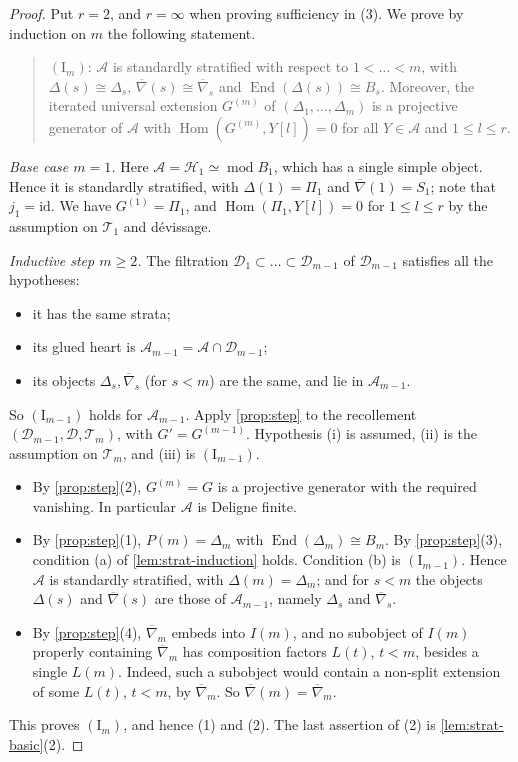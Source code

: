\documentclass[11pt,reqno]{amsart}
\theoremstyle{plain}
\theoremstyle{definition}
\theoremstyle{remark}
\DeclareMathOperator{\Hom}{Hom}
\DeclareMathOperator{\End}{End}
\newcommand{\modd}{\operatorname{mod}}
\newcommand{\nablabar}{\overline{\nabla}}
\newcommand{\cD}{\mathcal{D}}
\newcommand{\cA}{\mathcal{A}}
\newcommand{\cH}{\mathcal{H}}
\newcommand{\cT}{\mathcal{T}}
\begin{document}
\begin{proof}
Put $r=2$, and $r=\infty$ when proving sufficiency in (3). We prove by induction on $m$ the following statement.
\begin{quote}
$(\mathrm I_m)$: $\cA$ is standardly stratified with respect to $1<\dots<m$, with $\Delta(s)\cong\Delta_s$, $\nablabar(s)\cong\nablabar_s$ and $\End(\Delta(s))\cong B_s$. Moreover, the iterated universal extension $G^{(m)}$ of $(\Delta_1,\dots,\Delta_m)$ is a projective generator of $\cA$ with $\Hom(G^{(m)},Y[l])=0$ for all $Y\in\cA$ and $1\le l\le r$.
\end{quote}

\emph{Base case $m=1$.} Here $\cA=\cH_1\simeq\modd B_1$, which has a single simple object. Hence it is standardly stratified, with $\Delta(1)=\Pi_1$ and $\nablabar(1)=S_1$; note that $j_1=\mathrm{id}$. We have $G^{(1)}=\Pi_1$, and $\Hom(\Pi_1,Y[l])=0$ for $1\le l\le r$ by the assumption on $\cT_1$ and d\'evissage.

\emph{Inductive step $m\ge2$.} The filtration $\cD_1\subset\dots\subset\cD_{m-1}$ of $\cD_{m-1}$ satisfies all the hypotheses:
\begin{itemize}
\item it has the same strata;
\item its glued heart is $\cA_{m-1}=\cA\cap\cD_{m-1}$;
\item its objects $\Delta_s,\nablabar_s$ (for $s<m$) are the same, and lie in $\cA_{m-1}$.
\end{itemize}
So $(\mathrm I_{m-1})$ holds for $\cA_{m-1}$. Apply \cref{prop:step} to the recollement $(\cD_{m-1},\cD,\cT_m)$, with $G'=G^{(m-1)}$. Hypothesis (i) is assumed, (ii) is the assumption on $\cT_m$, and (iii) is $(\mathrm I_{m-1})$.
\begin{itemize}
\item By \cref{prop:step}(2), $G^{(m)}=G$ is a projective generator with the required vanishing. In particular $\cA$ is Deligne finite.
\item By \cref{prop:step}(1), $P(m)=\Delta_m$ with $\End(\Delta_m)\cong B_m$. By \cref{prop:step}(3), condition (a) of \cref{lem:strat-induction} holds. Condition (b) is $(\mathrm I_{m-1})$. Hence $\cA$ is standardly stratified, with $\Delta(m)=\Delta_m$; and for $s<m$ the objects $\Delta(s)$ and $\nablabar(s)$ are those of $\cA_{m-1}$, namely $\Delta_s$ and $\nablabar_s$.
\item By \cref{prop:step}(4), $\nablabar_m$ embeds into $I(m)$, and no subobject of $I(m)$ properly containing $\nablabar_m$ has composition factors $L(t)$, $t<m$, besides a single $L(m)$. Indeed, such a subobject would contain a non-split extension of some $L(t)$, $t<m$, by $\nablabar_m$. So $\nablabar(m)=\nablabar_m$.
\end{itemize}
This proves $(\mathrm I_m)$, and hence (1) and (2). The last assertion of (2) is \cref{lem:strat-basic}(2).


\end{proof}
\end{document}

